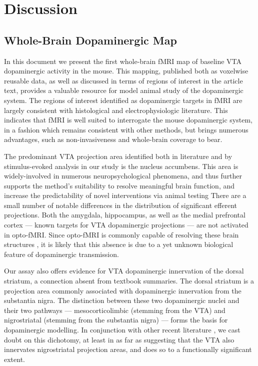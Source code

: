\section{Discussion}

\subsection{Whole-Brain Dopaminergic Map}

In this document we present the first whole-brain fMRI map of baseline VTA dopaminergic activity in the mouse.
This mapping, published both as voxelwise reusable data, as well as discussed in terms of regions of interest in the article text, provides a valuable resource for model animal study of the dopaminergic system.
The regions of interest identified as dopaminergic targets in fMRI are largely consistent with histological and electrophysiologic literature.
This indicates that fMRI is well suited to interrogate the mouse dopaminergic system, in a fashion which remains consistent with other methods, but brings numerous advantages, such as non-invasiveness and whole-brain coverage to bear.

The predominant VTA projection area identified both in literature and by stimulus-evoked analysis in our study is the nucleus accumbens.
This area is widely-involved in numerous neuropsychological phenomena, and thus further supports the method's suitability to resolve meaningful brain function, and increase the predictability of novel interventions via animal testing
There are a small number of notable differences in the distribution of significant efferent projections.
Both the amygdala, hippocampus, as well as the medial prefrontal cortex --- known targets for VTA dopaminergic projections --- are not activated in opto-fMRI.
Since opto-fMRI is commonly capable of resolving these brain structures \cite{Lebhardt2015,Grandjean2019}, it is likely that this absence is due to a yet unknown biological feature of dopaminergic transmission.

Our assay also offers evidence for VTA dopaminergic innervation of the dorsal striatum, a connection absent from textbook summaries.
The dorsal striatum is a projection area commonly associated with dopaminergic innervation from the substantia nigra.
The distinction between these two dopaminergic nuclei and their two pathways --- mesocorticolimbic (stemming from the VTA) and nigrostriatal (stemming from the substantia nigra) --- forms the basis for dopaminergic modelling.
In conjunction with other recent literature \cite{Lohani2016,Pan2010}, we cast doubt on this dichotomy, at least in as far as suggesting that the VTA also innervates nigrostriatal projection areas, and does so to a functionally significant extent.

